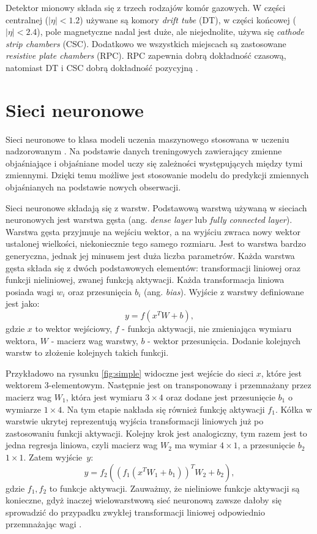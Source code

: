 \documentclass{pracalicmgr}
\begin{document}
	Detektor mionowy składa się z trzech rodzajów komór gazowych. W części centralnej ($|\eta| < 1.2$) używane są komory \textit{drift tube} (DT), w części końcowej ($|\eta| < 2.4$), pole magnetyczne nadal jest duże, ale niejednolite, używa się \textit{cathode strip chambers} (CSC). Dodatkowo we wszystkich miejscach są zastosowane \textit{resistive plate chambers} (RPC). RPC zapewnia dobrą dokładność czasową, natomiast DT i CSC dobrą dokładność pozycyjną \cite{cms_technical}.	
	
	\section{Sieci neuronowe}
	Sieci neuronowe to klasa modeli uczenia maszynowego stosowana w uczeniu nadzorowanym \cite{dl}. Na podstawie danych treningowych zawierający zmienne objaśniające i objaśniane model uczy się zależności występujących między tymi zmiennymi. Dzięki temu możliwe jest stosowanie modelu do predykcji zmiennych objaśnianych na podstawie nowych obserwacji.
	
	Sieci neuronowe składają się z warstw. Podstawową warstwą używaną w sieciach neuronowych jest warstwa gęsta (ang. \textit{dense layer} lub \textit{fully connected layer}). Warstwa gęsta przyjmuje na wejściu wektor, a na wyjściu zwraca nowy wektor ustalonej wielkości, niekoniecznie tego samego rozmiaru. Jest to warstwa bardzo generyczna, jednak jej minusem jest duża liczba parametrów. Każda warstwa gęsta składa się z dwóch podstawowych elementów: transformacji liniowej oraz funkcji nieliniowej, zwanej funkcją aktywacji. Każda transformacja liniowa posiada wagi $w_i$ oraz przesunięcia $b_i$ (ang. \textit{bias}). Wyjście z warstwy definiowane jest jako: $$y = f(x^TW + b),$$ gdzie $x$ to wektor wejściowy, $f$ - funkcja aktywacji, nie zmieniająca wymiaru wektora, $W$ - macierz wag warstwy, $b$ - wektor przesunięcia. Dodanie kolejnych warstw to złożenie kolejnych takich funkcji.
	
	 Przykładowo na rysunku \ref{fig:simple} widoczne jest wejście do sieci $x$, które jest wektorem 3-elementowym. Następnie jest on transponowany i przemnażany przez macierz wag $W_1$, która jest wymiaru $3\times4$ oraz dodane jest przesunięcie $b_1$ o wymiarze $1\times4$. Na tym etapie nakłada się również funkcję aktywacji $f_1$. Kółka w warstwie ukrytej reprezentują wyjścia transformacji liniowych już po zastosowaniu funkcji aktywacji. Kolejny krok jest analogiczny, tym razem jest to jedna regresja liniowa, czyli macierz wag $W_2$ ma wymiar $4\times1$, a przesunięcie $b_2$ $1\times1$. Zatem wyjście~$y$: $$y = f_2\left(\left(f_1(x^TW_1 + b_1)\right)^TW_2 + b_2\right),$$ gdzie $f_1, f_2$ to funkcje aktywacji. Zauważmy, że nieliniowe funkcje aktywacji są konieczne, gdyż inaczej wielowarstwową sieć neuronową zawsze dałoby się sprowadzić do przypadku zwykłej transformacji liniowej odpowiednio przemnażając wagi \cite{dl}.
	
\end{document}
